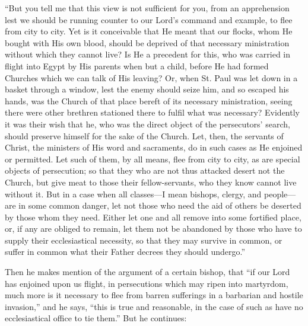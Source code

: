 ``But you tell me that this view is not sufficient for you,
from an apprehension lest we should be running counter to our Lord's
command and example, to flee from city to city. Yet is it conceivable
that He meant that our flocks, whom He bought with His own blood,
should be deprived of that necessary ministration without which they
cannot live? Is He a precedent for this, who was carried in flight
into Egypt by His parents when but a child, before He had formed
Churches which we can talk of His leaving? Or, when St. Paul was let
down in a basket through a window, lest the enemy should seize him,
and so escaped his hands, was the Church of that place bereft of its
necessary ministration, seeing there were other brethren stationed
there to fulfil what was necessary? Evidently it was their wish that
he, who was the direct object of the persecutors' search, should
preserve himself for the sake of the Church. Let, then, the servants
of Christ, the ministers of His word and sacraments, do in such cases
as He enjoined or permitted. Let such of them, by all means, flee from
city to city, as are special objects of persecution; so that they who
are not thus attacked desert not the Church, but give meat to those
their fellow-servants, who they know cannot live without it. But in a
case when all classes—I mean bishops, clergy, and people—are in
some common danger, let not those who need the aid of others be
deserted by those whom they need. Either let one and all remove into
some fortified place, or, if any are obliged to remain, let them not
be abandoned by those who have to supply their ecclesiastical
necessity, so that they may survive in common, or suffer in common
what their Father decrees they should undergo.''

Then he makes mention of the argument of a certain bishop, that
``if our Lord has enjoined upon us flight, in persecutions which
may ripen into martyrdom, much more is it necessary to flee from
barren sufferings in a barbarian and hostile invasion,'' and he
says, ``this is true and reasonable, in the case of such as
have no ecclesiastical office to tie them.'' But he continues:

